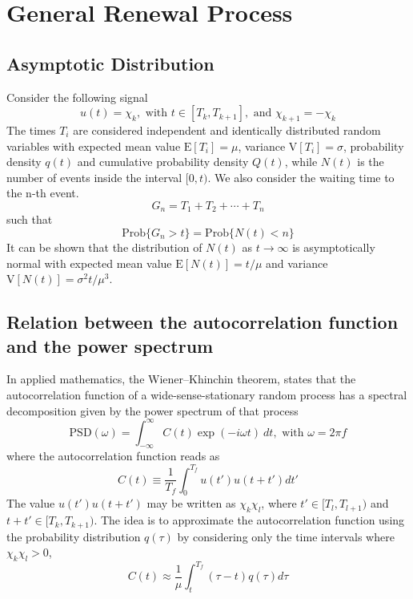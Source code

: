 \documentclass[10pt,a4paper]{article}
\newcommand{\prob}[1]{\mathrm{Prob}\lbrace #1\rbrace}
\newcommand{\power}[1]{\mathrm{PSD} ( #1 ) }
\newcommand{\expected}[1]{\mathrm{E}[ #1 ]}
\newcommand{\variance}[1]{\mathrm{V}[ #1 ]}
\begin{document}
  \section{ General Renewal Process }

  \subsection{ Asymptotic Distribution }

  Consider the following signal
  \begin{equation}
    u(t) = \chi_k, \mbox{ with } t \in [T_k, T_{k+1}], \mbox{ and } \chi_{k+1} = -\chi_k
  \end{equation}
  The times $T_i$ are considered independent and identically distributed random
  variables with expected mean value $\expected{T_i} = \mu$, variance
  $\variance{T_i} = \sigma$, probability density $q(t)$ and cumulative
  probability density $Q(t)$, while $N(t)$ is the number of events inside the
  interval $[0,t)$. We also consider the waiting time to the n-th event.
  \begin{equation}
    G_n = T_1 + T_2 + \cdots + T_n
  \end{equation}
  such that
  \begin{equation}
    \prob{G_n > t} = \prob{N(t) < n}
  \end{equation}
  It can be shown that the distribution of $N(t)$ as $t\to\infty$ is
  asymptotically normal with expected mean value $\expected{N(t)} = t/\mu$ and
  variance $\variance{N(t)} = \sigma^2 t/\mu^3$.

  \subsection{ Relation between the autocorrelation function and the power spectrum}

  In applied mathematics, the Wiener–Khinchin theorem, states that the
  autocorrelation function of a wide-sense-stationary random process has a
  spectral decomposition given by the power spectrum of that process
  \begin{equation}
    \power{\omega} = \int_{-\infty}^{\infty} C(t) \exp{(-i\omega t)} ~dt, \mbox{ with }
    \omega = 2\pi f
  \end{equation}
  where the autocorrelation function reads as
  \begin{equation}
    C(t) \equiv \frac{1}{T_f}\int_0^{T_f} u(t')u(t+t') dt'
  \end{equation}
  The value $u(t')u(t+t')$ may be written as $\chi_k\chi_l$, where $t'\in [T_l, T_{l+1})$
  and $t+t'\in [T_k, T_{k+1})$. The idea is to approximate the autocorrelation
  function using the probability distribution $q(\tau)$ by considering only the
  time intervals where $\chi_k\chi_l > 0$,
  \begin{equation}
    C(t) \approx \frac{1}{\mu} \int_t^{T_f} (\tau - t) q(\tau) d\tau
  \end{equation}
\end{document}
